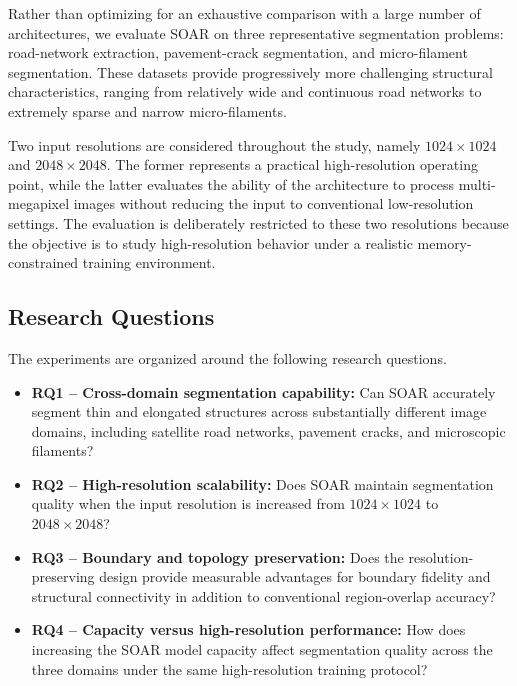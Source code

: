 \documentclass[11pt,a4paper]{article}
\begin{document}
Rather than optimizing for an exhaustive comparison with a large number of 
architectures, we evaluate SOAR on three representative segmentation 
problems: road-network extraction, pavement-crack segmentation, and 
micro-filament segmentation. These datasets provide progressively more 
challenging structural characteristics, ranging from relatively wide and 
continuous road networks to extremely sparse and narrow micro-filaments.

Two input resolutions are considered throughout the study, namely 
$1024\times1024$ and $2048\times2048$. The former represents a practical 
high-resolution operating point, while the latter evaluates the ability of 
the architecture to process multi-megapixel images without reducing the 
input to conventional low-resolution settings. The evaluation is deliberately 
restricted to these two resolutions because the objective is to study 
high-resolution behavior under a realistic memory-constrained training 
environment.

\subsection{Research Questions}

The experiments are organized around the following research questions.

\begin{itemize}

    \item \textbf{RQ1 -- Cross-domain segmentation capability:}
    Can SOAR accurately segment thin and elongated structures across 
    substantially different image domains, including satellite road networks,
    pavement cracks, and microscopic filaments?

    \item \textbf{RQ2 -- High-resolution scalability:}
    Does SOAR maintain segmentation quality when the input resolution is 
    increased from $1024\times1024$ to $2048\times2048$?

    \item \textbf{RQ3 -- Boundary and topology preservation:}
    Does the resolution-preserving design provide measurable advantages for 
    boundary fidelity and structural connectivity in addition to conventional 
    region-overlap accuracy?

    \item \textbf{RQ4 -- Capacity versus high-resolution performance:}
    How does increasing the SOAR model capacity affect segmentation quality 
    across the three domains under the same high-resolution training protocol?

\end{itemize}
\end{document}
